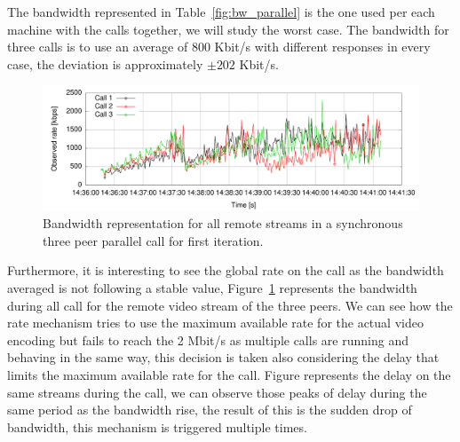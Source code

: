 The bandwidth represented in Table~\ref{fig:bw_parallel} is the one used per each machine with the calls together, we will study the worst case. The bandwidth for three calls is to use an average of 800 Kbit/s with different responses in every case, the deviation is approximately $\pm202$ Kbit/s. 

\begin{figure}[h]
  \centering
    \includegraphics[width=1\textwidth]{./figures/sync_three-calls.pdf}
      \caption[Bandwidth representation for all remote streams in a synchronous three peer parallel call for first iteration]{Bandwidth representation for all remote streams in a synchronous three peer parallel call for first iteration.}
	\label{fig:three_parallel}
\end{figure}


Furthermore, it is interesting to see the global rate on the call as the bandwidth averaged is not following a stable value, Figure~\ref{fig:three_parallel} represents the bandwidth during all call for the remote video stream of the three peers. We can see how the rate mechanism tries to use the maximum available rate for the actual video encoding but fails to reach the 2 Mbit/s as multiple calls are running and behaving in the same way, this decision is taken also considering the delay that limits the maximum available rate for the call. Figure represents the delay on the same streams during the call, we can observe those peaks of delay during the same period as the bandwidth rise, the result of this is the sudden drop of bandwidth, this mechanism is triggered multiple times.

